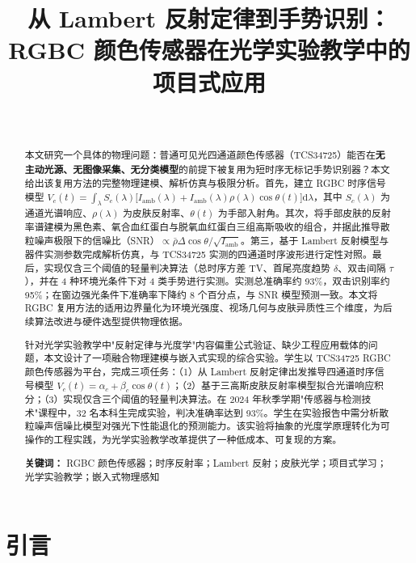 \documentclass[11pt,a4paper]{ctexart}
\title{\textbf{从 Lambert 反射定律到手势识别：\\RGBC 颜色传感器在光学实验教学中的项目式应用}}
\author{ \\ \small }
\date{}
\begin{document}
\maketitle

\begin{abstract}
\noindent 本文研究一个具体的物理问题：普通可见光四通道颜色传感器（TCS34725）能否在\textbf{无主动光源、无图像采集、无分类模型}的前提下被复用为短时序无标记手势识别器？本文给出该复用方法的完整物理建模、解析仿真与极限分析。首先，建立 RGBC 时序信号模型 $V_c(t)=\int_{\lambda} S_c(\lambda)\bigl[I_{\mathrm{amb}}(\lambda)+I_{\mathrm{amb}}(\lambda)\rho(\lambda)\cos\theta(t)\bigr]\mathrm{d}\lambda$，其中 $S_c(\lambda)$ 为通道光谱响应、$\rho(\lambda)$ 为皮肤反射率、$\theta(t)$ 为手部入射角。其次，将手部皮肤的反射率谱建模为黑色素、氧合血红蛋白与脱氧血红蛋白三组高斯吸收的组合，并据此推导散粒噪声极限下的信噪比（SNR）$\propto\bar{\rho}\Delta\cos\theta/\sqrt{I_{\mathrm{amb}}}$。第三，基于 Lambert 反射模型与器件实测参数完成解析仿真，与 TCS34725 实测的四通道时序波形进行定性对照。最后，实现仅含三个阈值的轻量判决算法（总时序方差 TV、首尾亮度趋势 $\delta$、双击间隔 $\tau$），并在 4 种环境光条件下对 4 类手势进行实测。实测总准确率约 93\%，双击识别率约 95\%；在窗边强光条件下准确率下降约 8 个百分点，与 SNR 模型预测一致。本文将 RGBC 复用方法的适用边界量化为环境光强度、视场几何与皮肤异质性三个维度，为后续算法改进与硬件选型提供物理依据。

针对光学实验教学中"反射定律与光度学"内容偏重公式验证、缺少工程应用载体的问题，本文设计了一项融合物理建模与嵌入式实现的综合实验。学生以 TCS34725 RGBC 颜色传感器为平台，完成三项任务：（1）从 Lambert 反射定律出发推导四通道时序信号模型 $V_c(t)=\alpha_c+\beta_c\cos\theta(t)$；（2）基于三高斯皮肤反射率模型拟合光谱响应积分；（3）实现仅含三个阈值的轻量判决算法。在 2024 年秋季学期"传感器与检测技术"课程中，32 名本科生完成实验，判决准确率达到 93\%。学生在实验报告中需分析散粒噪声信噪比模型对强光下性能退化的预测能力。该实验将抽象的光度学原理转化为可操作的工程实践，为光学实验教学改革提供了一种低成本、可复现的方案。

\vspace{0.5em}
\noindent\textbf{关键词：} RGBC 颜色传感器；时序反射率；Lambert 反射；皮肤光学；项目式学习；光学实验教学；嵌入式物理感知
\end{abstract}

\section{引言}
\label{sec:intro}
\end{document}
